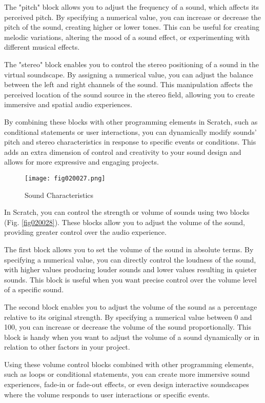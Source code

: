 The "pitch" block allows you to adjust the frequency of a sound, which affects its perceived pitch. By specifying a numerical value, you can increase or decrease the pitch of the sound, creating higher or lower tones. This can be useful for creating melodic variations, altering the mood of a sound effect, or experimenting with different musical effects.

The "stereo" block enables you to control the stereo positioning of a sound in the virtual soundscape. By assigning a numerical value, you can adjust the balance between the left and right channels of the sound. This manipulation affects the perceived location of the sound source in the stereo field, allowing you to create immersive and spatial audio experiences.

By combining these blocks with other programming elements in Scratch, such as conditional statements or user interactions, you can dynamically modify sounds' pitch and stereo characteristics in response to specific events or conditions. This adds an extra dimension of control and creativity to your sound design and allows for more expressive and engaging projects.

\begin{figure}[H]
   \centering
   \texttt{[image: fig020027.png]}
   \caption{Sound Characteristics}
\label{fig020027}
\end{figure}

In Scratch, you can control the strength or volume of sounds using two blocks (Fig. \ref{fig020028}). These blocks allow you to adjust the volume of the sound, providing greater control over the audio experience.

The first block allows you to set the volume of the sound in absolute terms. By specifying a numerical value, you can directly control the loudness of the sound, with higher values producing louder sounds and lower values resulting in quieter sounds. This block is useful when you want precise control over the volume level of a specific sound.

The second block enables you to adjust the volume of the sound as a percentage relative to its original strength. By specifying a numerical value between 0 and 100, you can increase or decrease the volume of the sound proportionally. This block is handy when you want to adjust the volume of a sound dynamically or in relation to other factors in your project.

Using these volume control blocks combined with other programming elements, such as loops or conditional statements, you can create more immersive sound experiences, fade-in or fade-out effects, or even design interactive soundscapes where the volume responds to user interactions or specific events.

